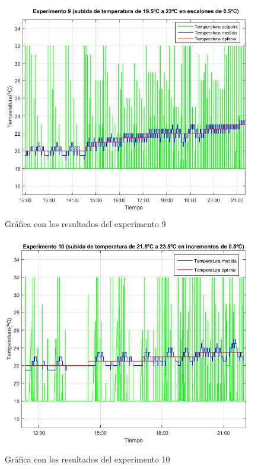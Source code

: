 \begin{figure}[H]
\centering
\includegraphics[width=130mm,height=95mm]{imagenes/anexo2/experimento9}
\caption {Gráfica con los resultados del experimento 9}
\label{figA2_5:experimento9}
\end{figure}

\begin{figure}[H]
\centering
\includegraphics[width=130mm,height=95mm]{imagenes/anexo2/experimento10}
\caption {Gráfica con los resultados del experimento 10}
\label{figA2_6:experimento10}
\end{figure}

